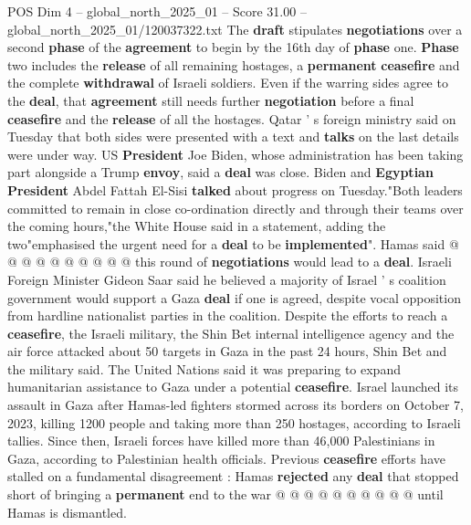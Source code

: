 \begin{textsample}{POS Dim 4 – global\_north\_2025\_01 – Score 31.00 – global\_north\_2025\_01/120037322.txt}
The \textbf{draft} stipulates \textbf{negotiations} over a second \textbf{phase} of the \textbf{agreement} to begin by the 16th day of \textbf{phase} one. \textbf{Phase} two includes the \textbf{release} of all remaining hostages, a \textbf{permanent} \textbf{ceasefire} and the complete \textbf{withdrawal} of Israeli soldiers.
Even if the warring sides agree to the \textbf{deal}, that \textbf{agreement} still needs further \textbf{negotiation} before a final \textbf{ceasefire} and the \textbf{release} of all the hostages.
Qatar ' s foreign ministry said on Tuesday that both sides were presented with a text and \textbf{talks} on the last details were under way.
US \textbf{President} Joe Biden, whose administration has been taking part alongside a Trump \textbf{envoy}, said a \textbf{deal} was close.
Biden and \textbf{Egyptian} \textbf{President} Abdel Fattah El-Sisi \textbf{talked} about progress on Tuesday."Both leaders committed to remain in close co-ordination directly and through their teams over the coming hours,"the White House said in a statement, adding the two"emphasised the urgent need for a \textbf{deal} to be \textbf{implemented}".
Hamas said @ @ @ @ @ @ @ @ @ @ this round of \textbf{negotiations} would lead to a \textbf{deal}.
Israeli Foreign Minister Gideon Saar said he believed a majority of Israel ' s coalition government would support a Gaza \textbf{deal} if one is agreed, despite vocal opposition from hardline nationalist parties in the coalition.
Despite the efforts to reach a \textbf{ceasefire}, the Israeli military, the Shin Bet internal intelligence agency and the air force attacked about 50 targets in Gaza in the past 24 hours, Shin Bet and the military said.
The United Nations said it was preparing to expand humanitarian assistance to Gaza under a potential \textbf{ceasefire}.
Israel launched its assault in Gaza after Hamas-led fighters stormed across its borders on October 7, 2023, killing 1200 people and taking more than 250 hostages, according to Israeli tallies.
Since then, Israeli forces have killed more than 46,000 Palestinians in Gaza, according to Palestinian health officials.
Previous \textbf{ceasefire} efforts have stalled on a fundamental disagreement : Hamas \textbf{rejected} any \textbf{deal} that stopped short of bringing a \textbf{permanent} end to the war @ @ @ @ @ @ @ @ @ @ until Hamas is dismantled.

\end{textsample}
